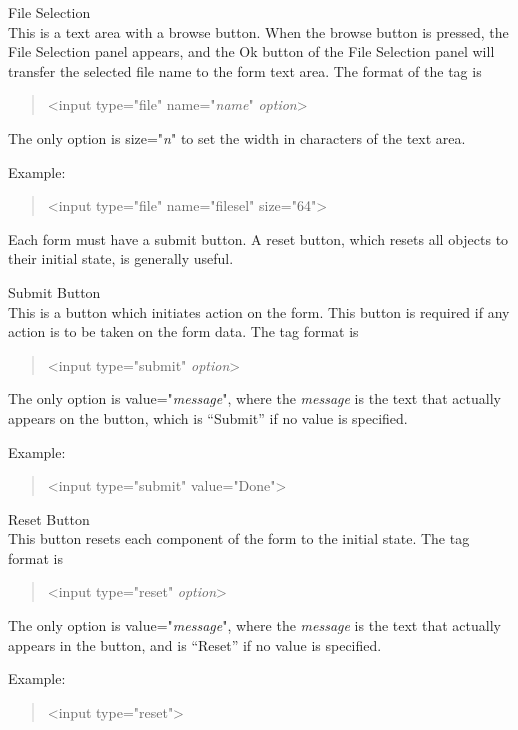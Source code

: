 \begin{description}
\item{File Selection}\\
This is a text area with a {\cb browse} button.  When the {\cb browse}
button is pressed, the {\cb File Selection} panel appears, and the
{\cb Ok} button of the {\cb File Selection} panel will transfer the
selected file name to the form text area.  The format of the tag is
\begin{quote}
{\vt <input type="file" name="{\it name\/}" {\it option\/}>}
\end{quote}
The only option is {\vt size="{\it n\/}"} to set the width in
characters of the text area.
\end{description}

Example:
\begin{quote}
{\vt <input type="file" name="filesel" size="64">}
\end{quote}

Each form must have a {\cb submit} button.  A {\cb reset} button,
which resets all objects to their initial state, is generally useful.

\begin{description}
\item{Submit Button}\\
This is a button which initiates action on the form.  This button is
required if any action is to be taken on the form data.  The tag
format is
\begin{quote}
{\vt <input type="submit" {\it option\/}>}
\end{quote}
The only option is {\vt value="{\it message\/}"}, where the {\it
message} is the text that actually appears on the button, which is
``Submit'' if no value is specified.

Example:
\begin{quote}
{\vt <input type="submit" value="Done">}
\end{quote}

\item{Reset Button}\\
This button resets each component of the form to the initial
state.  The tag format is
\begin{quote}
{\vt <input type="reset" {\it option\/}>}
\end{quote}
The only option is {\vt value="{\it message\/}"}, where the
{\it message} is the text that actually appears in the button,
and is ``Reset'' if no value is specified.

Example:
\begin{quote}
{\vt <input type="reset">}
\end{quote}
\end{description}

